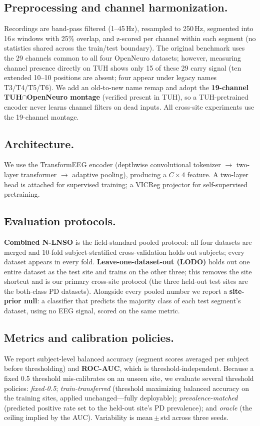 \documentclass[runningheads]{llncs}
\begin{document}
\subsection{Preprocessing and channel harmonization.}
Recordings are band-pass filtered (1--45\,Hz), resampled to 250\,Hz, segmented into 16\,s windows with 25\% overlap, and z-scored per channel within each segment (no statistics shared across the train/test boundary). The original benchmark uses the 29 channels common to all four OpenNeuro datasets; however, measuring channel presence directly on TUH shows only 15 of these 29 carry signal (ten extended 10--10 positions are absent; four appear under legacy names T3/T4/T5/T6). We add an old-to-new name remap and adopt the \textbf{19-channel TUH$\cap$OpenNeuro montage} (verified present in TUH), so a TUH-pretrained encoder never learns channel filters on dead inputs. All cross-site experiments use the 19-channel montage.

\subsection{Architecture.}
We use the TransformEEG encoder (depthwise convolutional tokenizer $\rightarrow$ two-layer transformer $\rightarrow$ adaptive pooling), producing a $C\times 4$ feature. A two-layer head is attached for supervised training; a VICReg projector for self-supervised pretraining.

\subsection{Evaluation protocols.}
\textbf{Combined N-LNSO} is the field-standard pooled protocol: all four datasets are merged and 10-fold subject-stratified cross-validation holds out subjects; every dataset appears in every fold. \textbf{Leave-one-dataset-out (LODO)} holds out one entire dataset as the test site and trains on the other three; this removes the site shortcut and is our primary cross-site protocol (the three held-out test sites are the both-class PD datasets). Alongside every pooled number we report a \textbf{site-prior null}: a classifier that predicts the majority class of each test segment's dataset, using no EEG signal, scored on the same metric.

\subsection{Metrics and calibration policies.}
We report subject-level balanced accuracy (segment scores averaged per subject before thresholding) and \textbf{ROC-AUC}, which is threshold-independent. Because a fixed 0.5 threshold mis-calibrates on an unseen site, we evaluate several threshold policies: \emph{fixed-0.5}; \emph{train-transferred} (threshold maximizing balanced accuracy on the training sites, applied unchanged---fully deployable); \emph{prevalence-matched} (predicted positive rate set to the held-out site's PD prevalence); and \emph{oracle} (the ceiling implied by the AUC). Variability is mean\,$\pm$\,std across three seeds.
\end{document}
